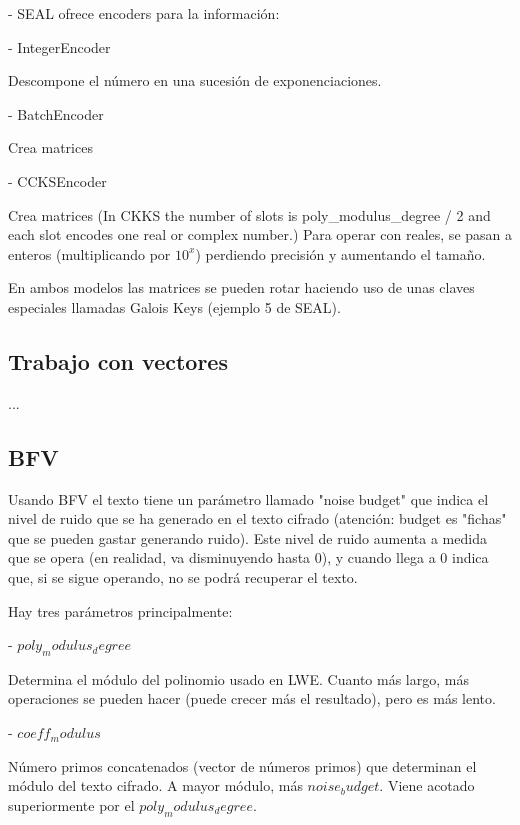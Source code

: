 - SEAL ofrece encoders para la información:

    - IntegerEncoder

    Descompone el número en una sucesión de exponenciaciones.

    - BatchEncoder

    Crea matrices

    - CCKSEncoder

    Crea matrices (In CKKS the number of slots is poly\_modulus\_degree / 2 and each slot encodes one real or complex number.) Para operar con reales, se pasan a enteros (multiplicando por $10^x$) perdiendo precisión y aumentando el tamaño.


    En ambos modelos las matrices se pueden rotar haciendo uso de unas claves especiales llamadas Galois Keys (ejemplo 5 de SEAL).

\subsection{Trabajo con vectores}

...

\subsection{BFV}

Usando BFV el texto tiene un parámetro llamado "noise budget" que indica el nivel de ruido que se ha generado en el texto cifrado (atención: budget es "fichas" que se pueden gastar generando ruido). Este nivel de ruido aumenta a medida que se opera (en realidad, va disminuyendo hasta 0), y cuando llega a 0 indica que, si se sigue operando, no se podrá recuperar el texto.


Hay tres parámetros principalmente:

- $poly_modulus_degree$

Determina el módulo del polinomio usado en LWE. Cuanto más largo, más operaciones se pueden hacer (puede crecer más el resultado), pero es más lento.

- $coeff_modulus$

Número primos concatenados (vector de números primos) que determinan el módulo del texto cifrado. A mayor módulo, más $noise_budget$. Viene acotado superiormente por el $poly_modulus_degree$.

